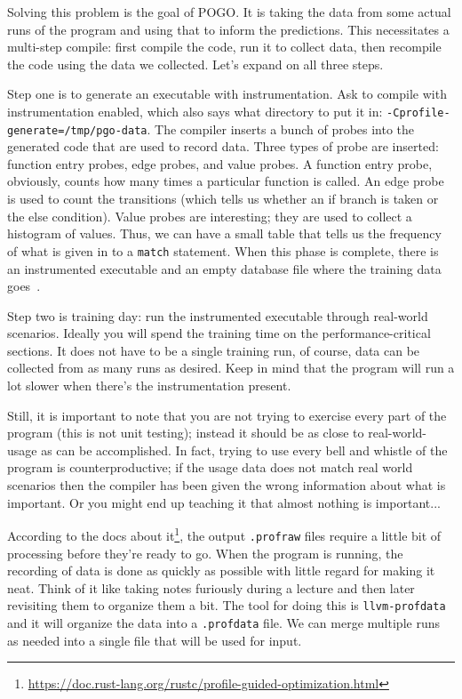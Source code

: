 Solving this problem is the goal of POGO. It is taking the data from some actual runs of the program and using that to inform the predictions. This necessitates a multi-step compile: first compile the code, run it to collect data, then recompile the code using the data we collected. Let's expand on all three steps.

Step one is to generate an executable with instrumentation. Ask to compile with instrumentation enabled, which also says what directory to put it in: \texttt{-Cprofile-generate=/tmp/pgo-data}. The compiler inserts a bunch of probes into the generated code that are used to record data. Three types of probe are inserted: function entry probes, edge probes, and value probes.  A function entry probe, obviously, counts how many times a particular function is called. An edge probe is used to count the transitions (which tells us whether an if branch is taken or the else condition). Value probes are interesting; they are used to collect a histogram of values. Thus, we can have a small table that tells us the frequency of what is given in to a \texttt{match} statement. When this phase is complete, there is an instrumented executable and an empty database file where the training data goes~\cite{pogo}. 

Step two is training day: run the instrumented executable through real-world scenarios. Ideally you will spend the training time on the performance-critical sections. It does not have to be a single training run, of course, data can be collected from as many runs as desired. Keep in mind that the program will run a lot slower when there's the instrumentation present. 

Still, it is important to note that you are not trying to exercise every part of the program (this is not unit testing); instead it should be as close to real-world-usage as can be accomplished. In fact, trying to use every bell and whistle of the program is counterproductive; if the usage data does not match real world scenarios then  the compiler has been given the wrong information about what is important. Or you might end up teaching it that almost nothing is important... 

According to the docs about it\footnote{\url{https://doc.rust-lang.org/rustc/profile-guided-optimization.html}}, the output \texttt{.profraw} files require a little bit of processing before they're ready to go. When the program is running, the recording of data is done as quickly as possible with little regard for making it neat. Think of it like taking notes furiously during a lecture and then later revisiting them to organize them a bit. The tool for doing this is \texttt{llvm-profdata} and it will organize the data into a \texttt{.profdata} file. We can merge multiple runs as needed into a single file that will be used for input. 

